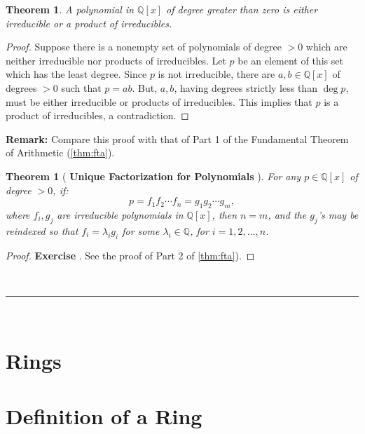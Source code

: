 \documentclass[a4paper,12pt]{report}
\newcounter{statement}
\numberwithin{statement}{chapter}
\newtheorem{thm}[statement]{Theorem}
\numberwithin{equation}{chapter}
\numberwithin{section}{chapter}
\numberwithin{subsection}{section}
\begin{document}
\begin{thm}
A polynomial in $\mathbb{Q}[x]$ of degree greater than zero is either irreducible or a product of irreducibles.
\end{thm}
\begin{proof}

Suppose there is a nonempty set of polynomials of degree $> 0$
which are neither irreducible nor products of irreducibles.  Let
$p$ be an element of this set which has the least degree.  Since $p$ is not irreducible,
there are $a, b \in \mathbb{Q}[x]$ of degrees $> 0$ such that $p = ab$. But, $a, b$, having degrees strictly
less than $\deg p$, must be either irreducible or products of irreducibles.  This implies that $p$ is a product
of irreducibles, a contradiction.


\end{proof}
 {\bf Remark:} 
Compare this proof with that of Part 1 of the
Fundamental Theorem of Arithmetic (\cref{thm:fta}).




\begin{thm}
[ {\bf Unique Factorization for Polynomials} ]



For any $p \in \mathbb{Q}[x]$ of degree $> 0$, if:
\[
p = f_1f_2\cdots f_n = g_1g_2\cdots g_m,
\]
where $f_i, g_j$ are irreducible polynomials in $\mathbb{Q}[x]$, then
$n = m$, and the $g_j$'s may be reindexed so that
$f_i = \lambda_i g_i$ for some $\lambda_i \in \mathbb{Q}$,
for $i = 1, 2, \ldots, n$.
\end{thm}
\begin{proof}

 {\bf Exercise} . See the proof of Part 2 of \cref{thm:fta}).
\end{proof}




\quad\\\hrule
\quad\\
\section*{Rings}


\section{Definition of a Ring}
\end{document}
